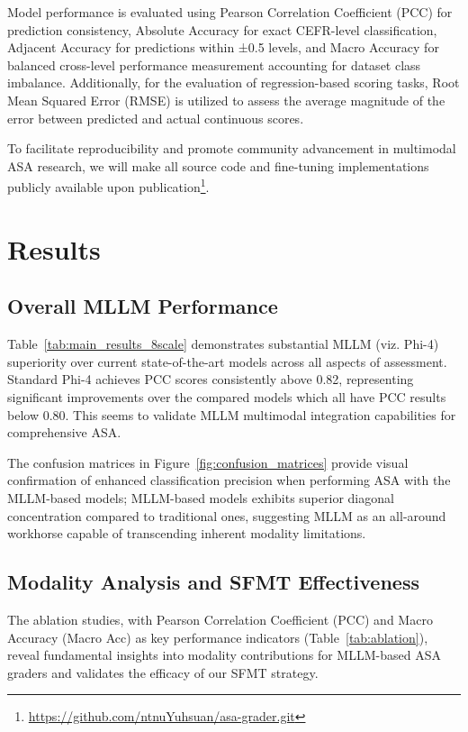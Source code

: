 \documentclass[conference]{IEEEtran}
\begin{document}
Model performance is evaluated using Pearson Correlation Coefficient (PCC) for prediction consistency, Absolute Accuracy for exact CEFR-level classification, Adjacent Accuracy for predictions within ±0.5 levels, and Macro Accuracy for balanced cross-level performance measurement accounting for dataset class imbalance. Additionally, for the evaluation of regression-based scoring tasks, Root Mean Squared Error (RMSE) is utilized to assess the average magnitude of the error between predicted and actual continuous scores.

To facilitate reproducibility and promote community advancement in multimodal ASA research, we will make all source code and fine-tuning implementations publicly available upon publication\footnote{\url{https://github.com/ntnuYuhsuan/asa-grader.git}}.

\section{Results}

\subsection{Overall MLLM Performance}

Table~\ref{tab:main_results_8scale} demonstrates substantial MLLM (viz. Phi-4) superiority over current state-of-the-art models across all aspects of assessment. Standard Phi-4 achieves PCC scores consistently above 0.82, representing significant improvements over the compared models which all have PCC results below 0.80. This seems to validate MLLM multimodal integration capabilities for comprehensive ASA.

The confusion matrices in Figure~\ref{fig:confusion_matrices} provide visual confirmation of enhanced classification precision when performing ASA with the MLLM-based models; MLLM-based models exhibits superior diagonal concentration compared to traditional ones, suggesting MLLM as an all-around workhorse capable of transcending inherent modality limitations.

\subsection{Modality Analysis and SFMT Effectiveness}
\label{subsec:modality_analysis}

The ablation studies, with Pearson Correlation Coefficient (PCC) and Macro Accuracy (Macro Acc) as key performance indicators (Table~\ref{tab:ablation}), reveal fundamental insights into modality contributions for MLLM-based ASA graders and validates the efficacy of our SFMT strategy.
\end{document}

